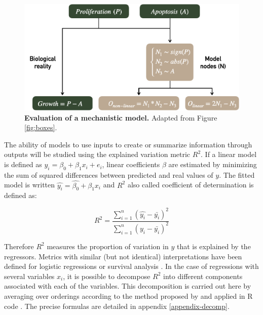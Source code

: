 \documentclass[a4paper,12pt,twoside,onecolumn,openright,final,oldfontcommands]{memoir}
\begin{document}
\begin{figure}

{\centering \includegraphics[width=0.8\linewidth]{fig/model-simulation} 

}

\caption[Definition of two distinct mechanistic models]{\textbf{Evaluation of a mechanistic model.}
Adapted from Figure \ref{fig:boxes}.}\label{fig:model-simulation}
\end{figure}







The ability of models to use inputs to create or summarize information
through outputs will be studied using the explained variation metric
\(R^2\). If a linear model is defined as \(y_i=\beta_0+\beta_1x_i+e_i\),
linear coefficients \(\beta\) are estimated by minimizing the sum of
squared differences between predicted and real values of \(y\). The
fitted model is written \(\hat{y_i}=\hat{\beta_0}+\hat{\beta_1}x_i\) and
\(R^2\) also called coefficient of determination is defined as:

\[R^2=\dfrac{\sum_{i=1}^{n} (\hat{y_i}-\bar{y_i})^2}{\sum_{i=1}^{n}  (y_i-\bar{y_i})^2}\]

Therefore \(R^2\) measures the proportion of variation in \(y\) that is
explained by the regressors. Metrics with similar (but not identical)
interpretations have been defined for logistic regressions or survival
analysis \citep{choodari2012simulation}. In the case of regressions with
several variables \(x_i\), it is possible to decompose \(R^2\) into
different components associated with each of the variables. This
decomposition is carried out here by averaging over orderings according
to the method proposed by \citet{lindeman1980introduction} and applied
in R code \citep{gromping2006relative}. The precise formulas are
detailed in appendix \ref{appendix-decomp}.
\end{document}
